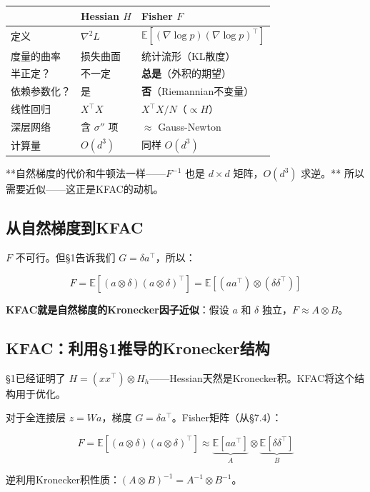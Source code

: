 \documentclass[12pt,a4paper]{article}
\begin{document}
\begin{center}\small
\begin{longtable}{|l|l|l|}
\hline
 & Hessian $H$ & Fisher $F$ \\
\hline
定义 & $\nabla^2 L$ & $\mathbb{E}[(\nabla\log p)(\nabla\log p)^\top]$ \\
度量的曲率 & 损失曲面 & 统计流形（KL散度） \\
半正定？ & 不一定 & \textbf{总是}（外积的期望） \\
依赖参数化？ & 是 & \textbf{否}（Riemannian不变量） \\
线性回归 & $X^\top X$ & $X^\top X / N$（$\propto H$） \\
深层网络 & 含 $\sigma''$ 项 & $\approx$ Gauss-Newton \\
计算量 & $O(d^3)$ & 同样 $O(d^3)$ \\
\hline
\end{longtable}
\end{center}


**自然梯度的代价和牛顿法一样——$F^{-1}$ 也是 $d \times d$ 矩阵，$O(d^3)$ 求逆。** 所以需要近似——这正是KFAC的动机。


\subsection{从自然梯度到KFAC}

$F$ 不可行。但§1告诉我们 $G = \delta a^\top$，所以：


\[F = \mathbb{E}[(a \otimes \delta)(a \otimes \delta)^\top] = \mathbb{E}[(aa^\top) \otimes (\delta\delta^\top)]\]

\textbf{KFAC就是自然梯度的Kronecker因子近似}：假设 $a$ 和 $\delta$ 独立，$F \approx A \otimes B$。


\subsection{KFAC：利用§1推导的Kronecker结构}

§1已经证明了 $H = (xx^\top) \otimes H_h$——Hessian天然是Kronecker积。KFAC将这个结构用于优化。

对于全连接层 $z = Wa$，梯度 $G = \delta a^\top$。Fisher矩阵（从§7.4）：


\[F = \mathbb{E}[(a \otimes \delta)(a \otimes \delta)^\top] \approx \underbrace{\mathbb{E}[aa^\top]}_{A} \otimes \underbrace{\mathbb{E}[\delta\delta^\top]}_{B}\]

逆利用Kronecker积性质：$(A \otimes B)^{-1} = A^{-1} \otimes B^{-1}$。
\end{document}
